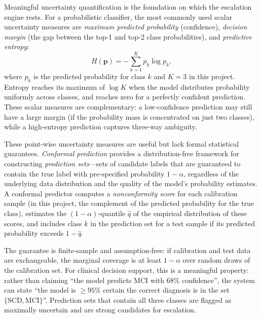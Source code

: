 \documentclass[12pt, a4paper]{report}
\begin{document}
  Meaningful uncertainty quantification is the foundation on which the escalation
  engine rests. For a probabilistic classifier, the most commonly used scalar
  uncertainty measures are \emph{maximum predicted probability} (confidence),
  \emph{decision margin} (the gap between the top-1 and top-2 class probabilities),
  and \emph{predictive entropy}:
  \begin{equation}
    H(\mathbf{p}) = -\sum_{k=1}^{K} p_k \log p_k,
    \label{eq:entropy}
  \end{equation}
  where $p_k$ is the predicted probability for class $k$ and $K=3$ in this project.
  Entropy reaches its maximum of $\log K$ when the model distributes probability
  uniformly across classes, and reaches zero for a perfectly confident prediction.
  These scalar measures are complementary: a low-confidence prediction may still have
  a large margin (if the probability mass is concentrated on just two classes), while
  a high-entropy prediction captures three-way ambiguity.

  These point-wise uncertainty measures are useful but lack formal statistical
  guarantees. \emph{Conformal prediction} \citep{shafer2008tutorial,
  angelopoulos2023conformal} provides a distribution-free framework for constructing
  \emph{prediction sets}---sets of candidate labels that are guaranteed to contain the
  true label with pre-specified probability $1-\alpha$, regardless of the underlying
  data distribution and the quality of the model's probability estimates. A conformal
  predictor computes a \emph{nonconformity score} for each calibration sample (in this
  project, the complement of the predicted probability for the true class), estimates
  the $(1-\alpha)$-quantile $\hat{q}$ of the empirical distribution of these scores,
  and includes class $k$ in the prediction set for a test sample if its predicted
  probability exceeds $1 - \hat{q}$.

  The guarantee is finite-sample and assumption-free: if calibration and test data are
  exchangeable, the marginal coverage is at least $1 - \alpha$ over random draws of
  the calibration set. For clinical decision support, this is a meaningful property:
  rather than claiming ``the model predicts MCI with 68\% confidence'', the system can
  state ``the model is $\geq\!95\%$ certain the correct diagnosis is in the set
  $\{\text{SCD}, \text{MCI}\}$''. Prediction sets that contain all three classes are
  flagged as maximally uncertain and are strong candidates for escalation.

\end{document}
